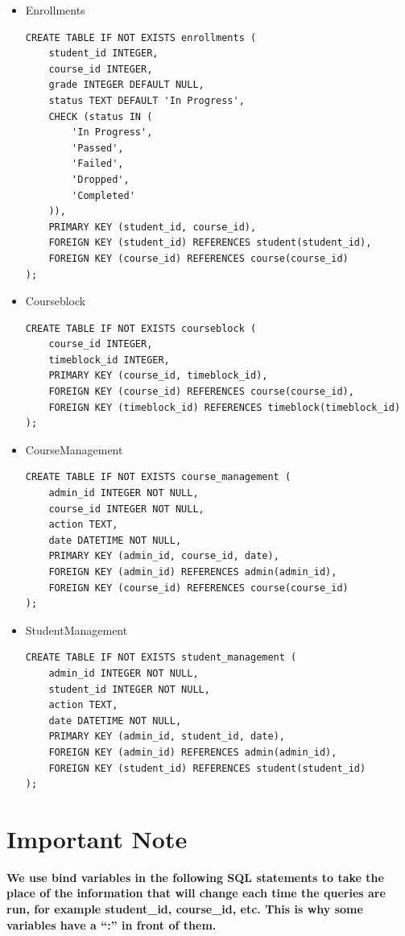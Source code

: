\documentclass{report}
\newcommand{\usection}[1]{\section*{#1}
\addcontentsline{toc}{section}{\protect\numberline{}#1}}
\begin{document}
\begin{itemize}
    \item Enrollments
    \begin{lstlisting}
CREATE TABLE IF NOT EXISTS enrollments (
    student_id INTEGER,
    course_id INTEGER,
    grade INTEGER DEFAULT NULL,
    status TEXT DEFAULT 'In Progress',
    CHECK (status IN (
        'In Progress',
        'Passed',
        'Failed',
        'Dropped',
        'Completed'
    )),
    PRIMARY KEY (student_id, course_id),
    FOREIGN KEY (student_id) REFERENCES student(student_id),
    FOREIGN KEY (course_id) REFERENCES course(course_id)
);
    \end{lstlisting}

    \item Courseblock
    \begin{lstlisting}
CREATE TABLE IF NOT EXISTS courseblock (
    course_id INTEGER,
    timeblock_id INTEGER,
    PRIMARY KEY (course_id, timeblock_id),
    FOREIGN KEY (course_id) REFERENCES course(course_id),
    FOREIGN KEY (timeblock_id) REFERENCES timeblock(timeblock_id)
);
    \end{lstlisting}
    
        \item CourseManagement
        \begin{lstlisting}
CREATE TABLE IF NOT EXISTS course_management (
    admin_id INTEGER NOT NULL,
    course_id INTEGER NOT NULL,
    action TEXT,
    date DATETIME NOT NULL,
    PRIMARY KEY (admin_id, course_id, date),
    FOREIGN KEY (admin_id) REFERENCES admin(admin_id),
    FOREIGN KEY (course_id) REFERENCES course(course_id)
);
        \end{lstlisting}

    \item StudentManagement
    \begin{lstlisting}
CREATE TABLE IF NOT EXISTS student_management (
    admin_id INTEGER NOT NULL,
    student_id INTEGER NOT NULL,
    action TEXT,
    date DATETIME NOT NULL,
    PRIMARY KEY (admin_id, student_id, date),
    FOREIGN KEY (admin_id) REFERENCES admin(admin_id),
    FOREIGN KEY (student_id) REFERENCES student(student_id)
);
    \end{lstlisting}
    
\end{itemize}

\usection{Important Note}

\textbf{We use bind variables in the following SQL statements to take the place of the information that will change each time the queries are run, for example student\_id, course\_id, etc. This is why some variables have a ``:'' in front of them.}
\end{document}
